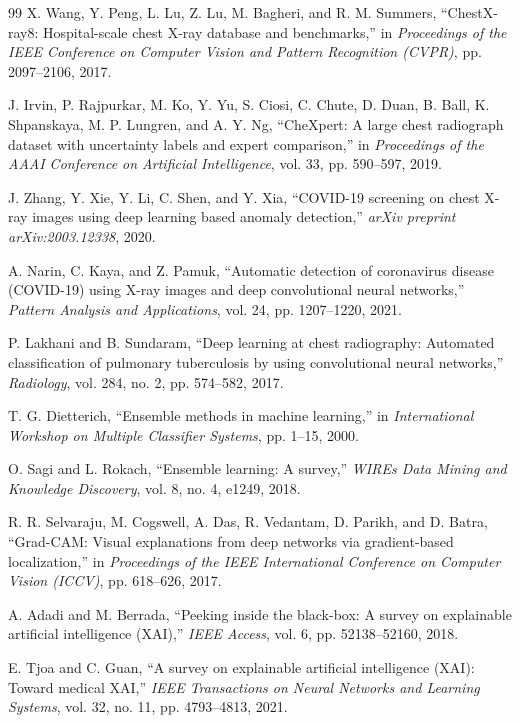 \documentclass[12pt]{report}
\begin{document}
\begin{thebibliography}{99}
X. Wang, Y. Peng, L. Lu, Z. Lu, M. Bagheri, and R. M. Summers,
``ChestX-ray8: Hospital-scale chest X-ray database and benchmarks,''
in \textit{Proceedings of the IEEE Conference on Computer Vision
and Pattern Recognition (CVPR)}, pp. 2097--2106, 2017.

J. Irvin, P. Rajpurkar, M. Ko, Y. Yu, S. Ciosi, C. Chute,
D. Duan, B. Ball, K. Shpanskaya, M. P. Lungren, and A. Y. Ng,
``CheXpert: A large chest radiograph dataset with uncertainty labels
and expert comparison,''
in \textit{Proceedings of the AAAI Conference on Artificial
Intelligence}, vol. 33, pp. 590--597, 2019.

J. Zhang, Y. Xie, Y. Li, C. Shen, and Y. Xia,
``COVID-19 screening on chest X-ray images using deep learning
based anomaly detection,''
\textit{arXiv preprint arXiv:2003.12338}, 2020.

A. Narin, C. Kaya, and Z. Pamuk,
``Automatic detection of coronavirus disease (COVID-19) using X-ray
images and deep convolutional neural networks,''
\textit{Pattern Analysis and Applications}, vol. 24,
pp. 1207--1220, 2021.

P. Lakhani and B. Sundaram,
``Deep learning at chest radiography: Automated classification of
pulmonary tuberculosis by using convolutional neural networks,''
\textit{Radiology}, vol. 284, no. 2, pp. 574--582, 2017.

T. G. Dietterich,
``Ensemble methods in machine learning,''
in \textit{International Workshop on Multiple Classifier Systems},
pp. 1--15, 2000.

O. Sagi and L. Rokach,
``Ensemble learning: A survey,''
\textit{WIREs Data Mining and Knowledge Discovery}, vol. 8,
no. 4, e1249, 2018.

R. R. Selvaraju, M. Cogswell, A. Das, R. Vedantam, D. Parikh,
and D. Batra,
``Grad-CAM: Visual explanations from deep networks via
gradient-based localization,''
in \textit{Proceedings of the IEEE International Conference on
Computer Vision (ICCV)}, pp. 618--626, 2017.

A. Adadi and M. Berrada,
``Peeking inside the black-box: A survey on explainable artificial
intelligence (XAI),''
\textit{IEEE Access}, vol. 6, pp. 52138--52160, 2018.

E. Tjoa and C. Guan,
``A survey on explainable artificial intelligence (XAI): Toward
medical XAI,''
\textit{IEEE Transactions on Neural Networks and Learning Systems},
vol. 32, no. 11, pp. 4793--4813, 2021.


\end{thebibliography}
\end{document}
